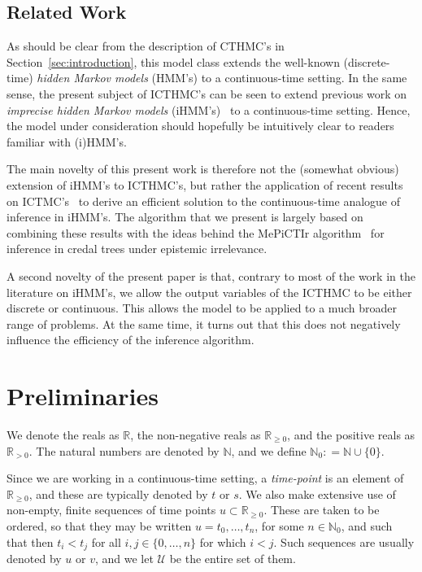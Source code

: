 \documentclass[twoside,11pt]{article}
\newcommand{\nats}{\mathbb{N}}
\newcommand{\natswith}{\nats_{0}}
\newcommand{\reals}{\mathbb{R}}
\newcommand{\realspos}{\reals_{>0}}
\newcommand{\realsnonneg}{\reals_{\geq 0}}
\newcommand{\coloneqq}{:\!=}
\begin{document}
\subsection{Related Work}\label{sec:related}

As should be clear from the description of CTHMC's in Section~\ref{sec:introduction}, this model class extends the well-known (discrete-time) \emph{hidden Markov models} (HMM's) to a continuous-time setting. In the same sense, the present subject of ICTHMC's can be seen to extend previous work on \emph{imprecise hidden Markov models} (iHMM's)~\citep{deCooman:2010gd} to a continuous-time setting. Hence, the model  under consideration should hopefully be intuitively clear to readers familiar with (i)HMM's. 

The main novelty of this present work is therefore not the (somewhat obvious) extension of iHMM's to ICTHMC's, but rather the application of recent results on ICTMC's~\citep{krak2016ictmc} to derive an efficient solution to the continuous-time analogue of inference in iHMM's. The algorithm that we present is largely based on combining these results with the ideas behind the MePiCTIr algorithm~\citep{deCooman:2010gd} for inference in credal trees under epistemic irrelevance.

A second novelty of the present paper is that, contrary to most of the work in the literature on iHMM's, we allow the output variables of the ICTHMC to be either discrete or continuous. This allows the model to be applied to a much broader range of problems. At the same time, it turns out that this does not negatively influence the efficiency of the inference algorithm.

\section{Preliminaries}\label{sec:prelim}

We denote the reals as $\reals$, the non-negative reals as $\realsnonneg$, and the positive reals as $\realspos$. The natural numbers are denoted by $\nats$, and we define $\natswith\coloneqq\nats\cup\{0\}$.

Since we are working in a continuous-time setting, a \emph{time-point} is an element of $\realsnonneg$, and these are typically denoted by $t$ or $s$. We also make extensive use of non-empty, finite sequences of time points $u\subset\realsnonneg$. These are taken to be ordered, so that they may be written $u=t_0,\ldots,t_n$, for some $n\in\natswith$, and such that then $t_i<t_j$ for all $i,j\in\{0,\ldots,n\}$ for which $i< j$. Such sequences are usually denoted by $u$ or $v$, and we let $\mathcal{U}$ be the entire set of them.
\end{document}
